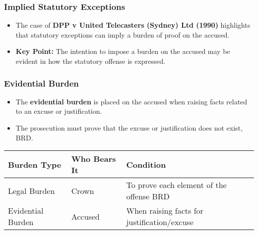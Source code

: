 \subsubsection{Implied Statutory
Exceptions}\label{implied-statutory-exceptions}

\begin{itemize}
\tightlist
\item
  The case of \textbf{DPP v United Telecasters (Sydney) Ltd (1990)}
  highlights that statutory exceptions can imply a burden of proof on
  the accused.
\item
  \textbf{Key Point:} The intention to impose a burden on the accused
  may be evident in how the statutory offense is expressed.
\end{itemize}

\subsubsection{Evidential Burden}\label{evidential-burden}

\begin{itemize}
\tightlist
\item
  The \textbf{evidential burden} is placed on the accused when raising
  facts related to an excuse or justification.
\item
  The prosecution must prove that the excuse or justification does not
  exist, BRD.
\end{itemize}

\begin{longtable}[]{@{}
  >{\raggedright\arraybackslash}p{}
  >{\raggedright\arraybackslash}p{}
  >{\raggedright\arraybackslash}p{}@{}}
\toprule\noalign{}
\begin{minipage}[b]{\linewidth}\raggedright
Burden Type
\end{minipage} & \begin{minipage}[b]{\linewidth}\raggedright
Who Bears It
\end{minipage} & \begin{minipage}[b]{\linewidth}\raggedright
Condition
\end{minipage} \\
\midrule\noalign{}
\endhead
\bottomrule\noalign{}
\endlastfoot
Legal Burden & Crown & To prove each element of the offense BRD \\
Evidential Burden & Accused & When raising facts for
justification/excuse \\
\end{longtable}

